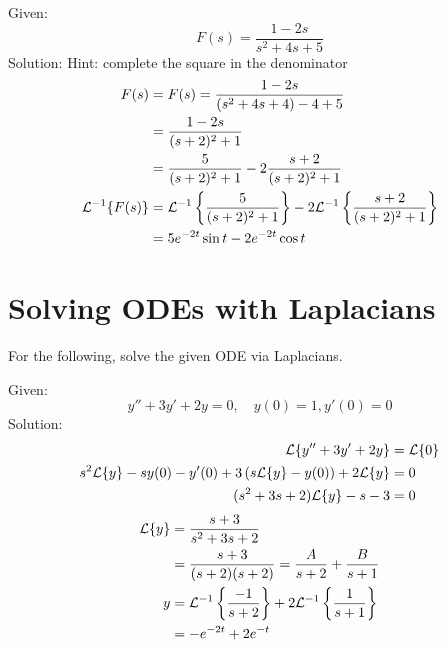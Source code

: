 \documentclass[diffeq.tex]{subfiles}
\begin{document}
\begin{homework*}[255.7]
    Given:
    \begin{equation}
        F(s) = \frac{1 - 2s}{s^{2} + 4s + 5}
    \end{equation}
    Solution:
    Hint: complete the square in the denominator
    \begin{alignat}{1}
        F(s) &= F(s) = \frac{1 - 2s}{(s^{2} + 4s + 4) - 4 + 5}\\
        &= \frac{1 - 2s}{(s + 2)^{2} + 1}\\
        &= \frac{5}{(s + 2)^{2} + 1} - 2 \frac{s + 2}{(s + 2)^{2} + 1}\\
        \mathcal{L}^{-1}\{F(s)\} &= \mathcal{L}^{-1}\left\{\frac{5}{(s + 2)^{2} + 1}\right\} - 2\mathcal{L}^{-1}\left\{\frac{s + 2}{(s + 2)^{2} + 1}\right\}\\
        &= 5e^{-2t}\sin t - 2e^{-2t}\cos t
    \end{alignat}
\end{homework*}
\np
\section{Solving ODEs with Laplacians}
For the following, solve the given ODE via Laplacians.
\begin{homework}[255.9]
    Given:
    \begin{equation}
        y'' + 3y' + 2y = 0,\quad y(0) = 1, y'(0) = 0
    \end{equation}
    Solution:
    \begin{alignat}{1}
        \mathcal{L}\{y'' + 3y' + 2y\} &= \mathcal{L}\{0\}\\
        s^{2}\mathcal{L}\{y\} - sy(0) - y'(0) + 3\left(s\mathcal{L}\{y\} - y(0)\right) + 2\mathcal{L}\{y\} &= 0\\
        (s^{2} + 3s + 2)\mathcal{L}\{y\} - s - 3 &= 0\\
    \end{alignat}
    \begin{alignat}{1}
        \mathcal{L}\{y\} &= \frac{s + 3}{s^{2} + 3s + 2}\\
        &= \frac{s + 3}{(s + 2)(s + 2)} = \frac{A}{s + 2} + \frac{B}{s + 1}\\
        y &= \mathcal{L}^{-1}\left\{\frac{-1}{s+2}\right\} + 2 \mathcal{L}^{-1}\left\{\frac{1}{s + 1}\right\}\\
        &= -e^{-2t} + 2e^{-t}
    \end{alignat}
\end{homework}
\iffalse
TODO: Finish digitizing the following homework problems:
- 255: 11, 13, 15
- 263: 5, 7, 13
- 268: 4, 6
- 279: 5, 7, 8
\fi
\end{document}
